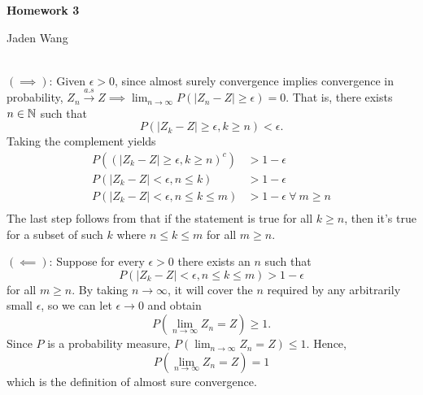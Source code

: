 \documentclass[12pt]{article}
\begin{document}
\centerline {\textsf{\textbf{\LARGE{Homework 3}}}}
\centerline {Jaden Wang}
\vspace{.15in}
\begin{problem}[1]
~\\	
$ (\implies)$: Given $ \epsilon > 0$, since almost surely convergence implies convergence in probability,  $ Z_n \xrightarrow{ a.s} Z \implies \lim_{ n \to \infty} P(|Z_n - Z|\geq \epsilon) =0 $. That is, there exists $ n \in \mathbb{N}$ such that 
	\[
		P(|Z_k - Z|\geq \epsilon, k\geq n)< \epsilon
	.\] 
	Taking the complement yields
\begin{align*}
	P((|Z_k - Z|\geq \epsilon, k \geq n)^{c}) &> 1- \epsilon\\
	P(|Z_k - Z|< \epsilon, n\leq k)&> 1- \epsilon\\
	P(|Z_k - Z|< \epsilon, n\leq k\leq m)&> 1- \epsilon \ \forall \ m \geq n\\
\end{align*}	
The last step follows from that if the statement is true for all $ k \geq n$, then it's true for a subset of such  $ k$ where  $ n \leq k \leq m$ for all $ m \geq n$.

$ (\impliedby)$: Suppose for every $ \epsilon>0$ there exists an $ n$  such that 
\[
	P(|Z_k -Z| < \epsilon, n\leq k\leq m)> 1 - \epsilon
\] 
for all $ m \geq n$. By taking $ n \to \infty$, it will cover the $ n$ required by any arbitrarily small $ \epsilon$, so we can let $ \epsilon \to 0$ and obtain
\[
	P(\lim_{ n \to \infty} Z_n = Z) \geq 1 
.\] 
Since  $ P$ is a probability measure,  $ P(\lim_{ n \to \infty} Z_n = Z) \leq 1$. Hence, 
\[
P(\lim_{ n \to \infty} Z_n = Z) = 1 
\] 
which is the definition of almost sure convergence.
\end{problem}
\end{document}
